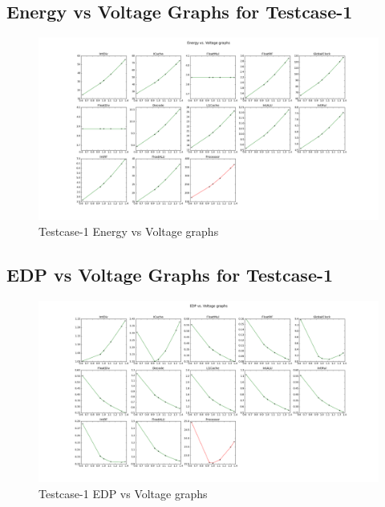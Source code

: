 \documentclass[12pt]{report}
\begin{document}
\clearpage
\subsection*{Energy vs Voltage Graphs for Testcase-1}
\begin{figure}[!htb]
\begin{sideways}

\caption{Testcase-1 Energy vs Voltage graphs}
\centering
\includegraphics[width=0.9\textheight]{bench1_figure_1.png}

\end{sideways}
\end{figure}

\clearpage
\subsection*{EDP vs Voltage Graphs for Testcase-1}
\begin{figure}[!htb]
\begin{sideways}

\caption{Testcase-1 EDP vs Voltage graphs}
\centering
\includegraphics[width=0.9\textheight]{bench1_figure_2.png}

\end{sideways}
\end{figure}
\end{document}
